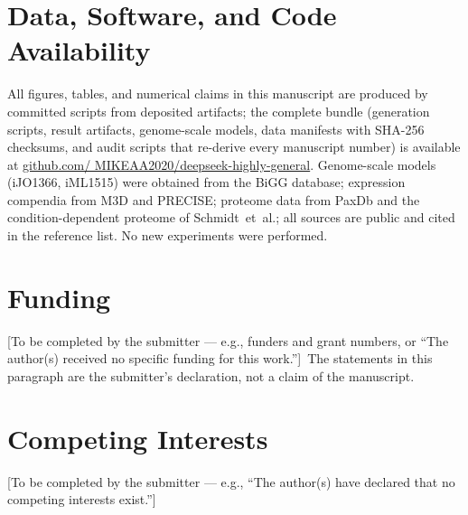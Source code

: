 \documentclass[11pt,a4paper]{article}
\theoremstyle{plain}
\theoremstyle{definition}
\theoremstyle{remark}
\begin{document}
\section*{Data, Software, and Code Availability}
All figures, tables, and numerical claims in this manuscript are
produced by committed scripts from deposited artifacts; the complete
bundle (generation scripts, result artifacts, genome-scale models,
data manifests with SHA-256 checksums, and audit scripts that
re-derive every manuscript number) is available at
\href{https://github.com/MIKEAA2020/deepseek-highly-general}{github.com/
MIKEAA2020/deepseek-highly-general}. Genome-scale models
(iJO1366, iML1515) were obtained from the BiGG database; expression
compendia from M3D and PRECISE; proteome data from PaxDb and the
condition-dependent proteome of Schmidt~et~al.; all sources are
public and cited in the reference list. No new experiments were
performed.

\section*{Funding}
[To be completed by the submitter --- e.g., funders and grant
numbers, or ``The author(s) received no specific funding for this
work.'']\ The statements in this paragraph are the submitter's
declaration, not a claim of the manuscript.

\section*{Competing Interests}
[To be completed by the submitter --- e.g., ``The author(s) have
declared that no competing interests exist.'']


\end{document}
